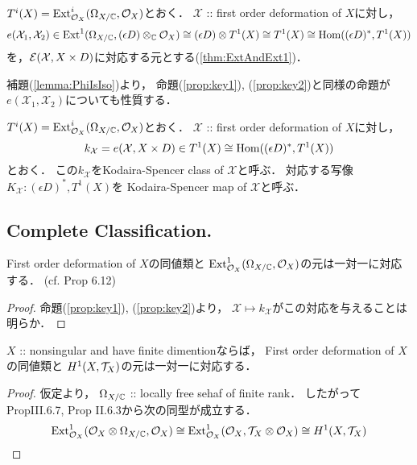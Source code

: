 \documentclass[a4paper]{jsarticle}
\newcommand{\famX}{\mathcal{X}}
\begin{document}
    \subsection{\tp{$e(\famX_1, \famX_2)$}{e(X1,X2)}}
    \begin{Def}
        $T^i(X)=\operatorname{Ext}^i_{\mathcal{O}_X}(\Omega_{X/\mathbb{C}}, \mathcal{O}_X)$とおく．
        $\famX$ :: first order deformation of $X$に対し，
        \[
            e(\famX_1, \famX_2)
                \in
                \Ext^1(\shDer_{X/\C}, (\epsilon D) \otimes_{\C} \shO_X)
                \iso (\epsilon D) \otimes T^1(X)
                \iso T^1(X)
                \iso \Hom((\epsilon D)^*, T^1(X))
        \]
        を，$\shE(\famX, X \times D)$に対応する元とする(\ref{thm:ExtAndExt1})．
    \end{Def}
    補題(\ref{lemma:PhiIsIso})より，
    命題(\ref{prop:key1}), (\ref{prop:key2})と同様の命題が
    $e(\famX_1, \famX_2)$についても性質する．

    \begin{Def}\label{def:KSclass-map}
        $T^i(X)=\operatorname{Ext}^i_{\mathcal{O}_X}(\Omega_{X/\mathbb{C}}, \mathcal{O}_X)$とおく．
        $\famX$ :: first order deformation of $X$に対し，
        \[
            k_{\famX}=e(\famX, X \times D)
                \in T^1(X) \iso \Hom((\epsilon D)^*, T^1(X))
        \]
        とおく．
        この$k_{\famX}$をKodaira-Spencer class of $\famX$と呼ぶ．
        対応する写像$K_{\famX}: (\epsilon D)^*, T^1(X)$を
        Kodaira-Spencer map of $\famX$と呼ぶ．
    \end{Def}
    
\subsection{Complete Classification.}
    \begin{Thm}\label{thm:SpaceOf1stOrdDefOfLCI}
        First order deformation of $X$の同値類と
        $\operatorname{Ext}^1_{\mathcal{O}_X}(\Omega_{X/\mathbb{C}}, \mathcal{O}_X)$の元は一対一に対応する．
        (cf. \cite{DefLCI} Prop 6.12)
    \end{Thm}
    \begin{proof}
        命題(\ref{prop:key1}), (\ref{prop:key2})より，
        $\famX \mapsto k_{\famX}$がこの対応を与えることは明らか．
    \end{proof}

    \begin{Cor} \label{cor:nonsing-fod}
        $X$ :: nonsingular and have finite dimentionならば，
        First order deformation of $X$の同値類と
        $H^1(X, \mathcal{T}_X)$の元は一対一に対応する．
    \end{Cor}
    \begin{proof}
        仮定より，
        $\Omega_{X/\mathbb{C}}$ :: locally free sehaf of finite rank．
        したがって\cite{HarAG} PropIII.6.7, Prop II.6.3から次の同型が成立する．
        \[
            \operatorname{Ext}^1_{\mathcal{O}_X}(\mathcal{O}_X \otimes \Omega_{X/\mathbb{C}}, \mathcal{O}_X)
            \cong \operatorname{Ext}^1_{\mathcal{O}_X}(\mathcal{O}_X, \mathcal{T}_X \otimes \mathcal{O}_X)
            \cong H^1(X, \mathcal{T}_X)
        \]
    \end{proof}
\end{document}
